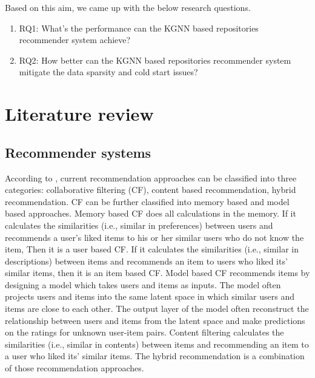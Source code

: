 \documentclass[11pt,twoside]{report}
\begin{document}
Based on this aim, we came up with the below research questions.

\begin{enumerate}
    \item RQ1: What’s the performance can the KGNN based repositories recommender system achieve?
    \item RQ2: How better can the KGNN based repositories recommender system mitigate the data sparsity and cold start issues?
\end{enumerate}

\chapter{Literature review}
\section{Recommender systems}
According to \cite{mansur_review_nodate, park_literature_2012}, current recommendation approaches can be classified into three categories: collaborative filtering (CF), content based recommendation, hybrid recommendation. CF can be further classified into memory based and model based approaches. Memory based CF does all calculations in the memory. If it calculates the similarities (i.e., similar in preferences) between users and recommends a user's liked items to his or her similar users who do not know the item, Then it is a user based CF. If it calculates the similarities (i.e., similar in descriptions) between items and recommends an item to users who liked its' similar items, then it is an item based CF. Model based CF recommends items by designing a model which takes users and items as inputs. The model often projects users and items into the same latent space in which similar users and items are close to each other. The output layer of the model often reconstruct the relationship between users and items from the latent space and make predictions on the ratings for unknown user-item pairs. Content filtering calculates the similarities (i.e., similar in contents) between items and recommending an item to a user who liked its' similar items. The hybrid recommendation is a combination of those recommendation approaches.
\end{document}
